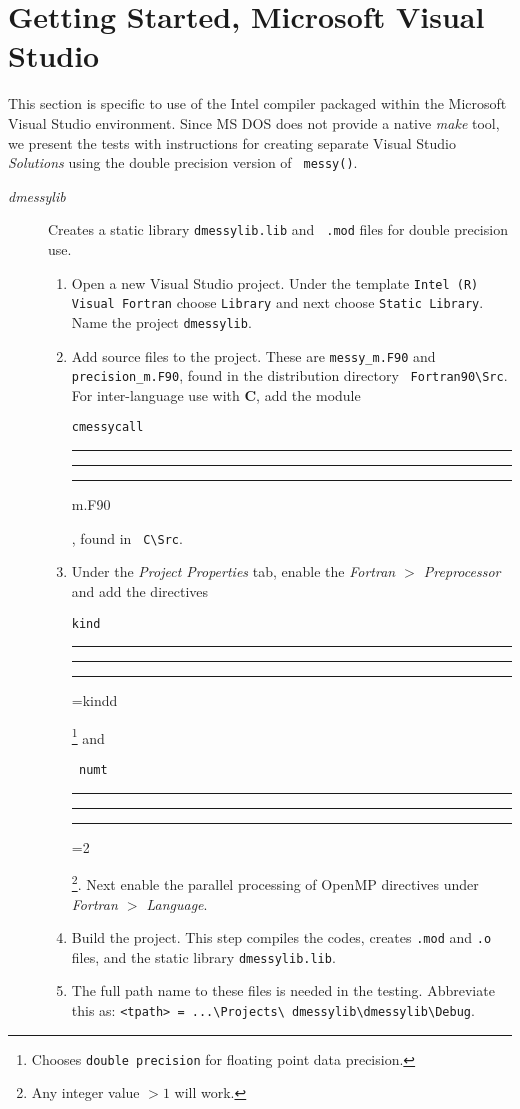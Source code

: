 \documentclass[12pt]{article}
\DeclareRobustCommand{\us}{\rule{.2pt}{0pt}\rule[-.8pt]{.4em}{.5pt}%
  \rule{.2pt}{0pt}}
\DeclareRobustCommand{\us}{\rule{.2pt}{0pt}\rule[-.8pt]{.4em}{.5pt}%
  \rule{.2pt}{0pt}}
\begin{document}
\section{Getting Started, Microsoft Visual Studio}
This section is specific to use of the Intel compiler packaged within the
Microsoft Visual Studio environment.  Since MS DOS does not provide a native
{\em make} tool, we present the tests with instructions for creating separate
Visual Studio {\em Solutions} using the double precision version of {\tt
  messy()}.

\begin{description}
\item[{\em dmessylib}] Creates a static library {\tt dmessylib.lib} and {\tt
    .mod} files for double precision use.
  \begin{enumerate}
  \item Open a new Visual Studio project.  Under the template {\tt Intel (R)
      Visual Fortran} choose {\tt Library} and next choose {\tt Static Library}.
    Name the project {\tt dmessylib}.
  \item Add source files to the project.  These are {\tt messy\_m.F90} and {\tt
      precision\_m.F90}, found in the distribution directory {\tt
      Fortran90\textbackslash Src}.  For inter-language use with {\bf C},
      add the module {\tt cmessycall\us m.F90}, found in {\tt
     C\textbackslash Src}.
  \item Under the {\em Project Properties} tab, enable the {\em Fortran $>$
      Preprocessor} and add the directives {\tt kind\us=kindd} \footnote{Chooses
      {\tt double precision} for floating point data precision.} and {\tt
      numt\us=2}\footnote{Any integer value $> 1$ will work.}.  Next enable the
    parallel processing of OpenMP directives under {\em Fortran $>$ Language}.
  \item Build the project.  This step compiles the codes, creates {\tt .mod} and
    {\tt .o} files, and the static library {\tt dmessylib.lib}.
  \item The full path name to these files is needed in the testing.  Abbreviate
    this as: {\tt <tpath> = ...\textbackslash Projects\textbackslash
      dmessylib\textbackslash dmessylib\textbackslash Debug}.
  \end {enumerate}



\end{description}
\end{document}
